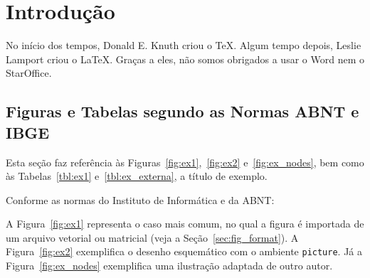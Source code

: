 \documentclass[ppgc,mestrado,biblatex]{iiufrgs}
\begin{document}

\listoffigures


\tableofcontents


\chapter{Introdução}
No início dos tempos, Donald E. Knuth criou o \TeX. Algum tempo depois, Leslie Lamport criou o \LaTeX. Graças a eles, não somos obrigados a usar o Word nem o StarOffice.

\section{Figuras e Tabelas segundo as Normas ABNT e IBGE}

Esta seção faz referência às Figuras~\ref{fig:ex1},~\ref{fig:ex2} e~\ref{fig:ex_nodes}, bem como às Tabelas~\ref{tbl:ex1} e~\ref{tbl:ex_externa}, a título de exemplo.

Conforme as normas do Instituto de Informática e da ABNT:

A Figura~\ref{fig:ex1} representa o caso mais comum, no qual a figura é importada de um arquivo vetorial ou matricial (veja a Seção~\ref{sec:fig_format}). A Figura~\ref{fig:ex2} exemplifica o desenho esquemático com o ambiente \texttt{picture}. Já a Figura~\ref{fig:ex_nodes} exemplifica uma ilustração adaptada de outro autor.
\end{document}
